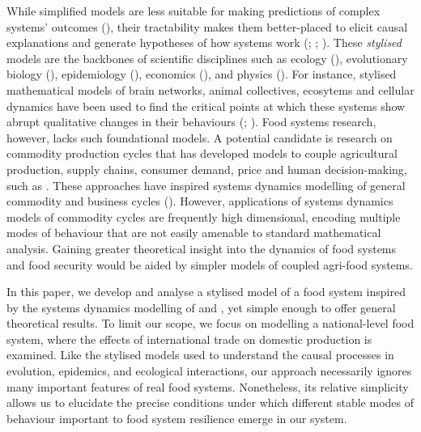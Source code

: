 \documentclass[12pt]{article}
\begin{document}
While simplified models are less suitable for making predictions of complex systems' outcomes (\cite{suweis2015}), their tractability makes them better-placed to elicit causal explanations and generate hypotheses of how systems work (\cite{smaldino2017}; \cite{smaldino2019}; \cite{otto2020}). These \textit{stylised} models are the backbones of scientific disciplines such as ecology (\cite{may1973}), evolutionary biology (\cite{boyd2003}), epidemiology (\cite{kermack1927}), economics (\cite{nerlove1958}), and physics (\cite{strogatz1994}). For instance, stylised mathematical models of brain networks, animal collectives, ecosytems and cellular dynamics have been used to find the critical points at which these systems show abrupt qualitative changes in their behaviours (\cite{sole1996}; \cite{scheffer2001}). Food systems research, however, lacks such foundational models. A potential candidate is research on commodity production cycles that has developed models to couple agricultural production, supply chains, consumer demand, price and human decision-making, such as \textcite{meadows1971}. These approaches have inspired systems dynamics modelling of general commodity and business cycles (\cite{sterman2000}). However, applications of systems dynamics models of commodity cycles are frequently high dimensional, encoding multiple modes of behaviour that are not easily amenable to standard mathematical analysis. Gaining greater theoretical insight into the dynamics of food systems and food security would be aided by simpler models of coupled agri-food systems.

In this paper, we develop and analyse a stylised model of a food system inspired by the systems dynamics modelling of \textcite{meadows1971} and \textcite{sterman2000}, yet simple enough to offer general theoretical results. To limit our scope, we focus on modelling a national-level food system, where the effects of international trade on domestic production is examined. Like the stylised models used to understand the causal processes in evolution, epidemics, and ecological interactions, our approach necessarily ignores many important features of real food systems. Nonetheless, its relative simplicity allows us to elucidate the precise conditions under which different stable modes of behaviour important to food system resilience emerge in our system.
\end{document}
